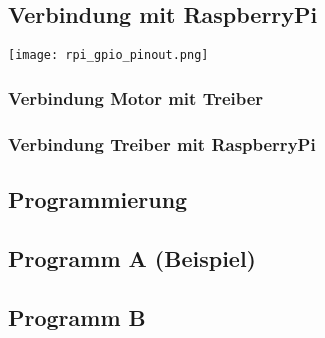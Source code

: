 \subsection{Verbindung mit RaspberryPi}

\begin{center}
\texttt{[image: rpi\_gpio\_pinout.png]}
\end{center}

\subsubsection{Verbindung Motor mit Treiber}
\subsubsection{Verbindung Treiber mit RaspberryPi}

\subsection{Programmierung}
\subsection{Programm A (Beispiel)}
\subsection{Programm B}
